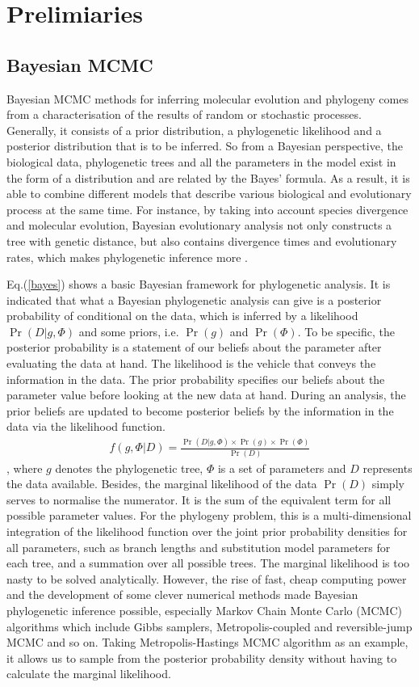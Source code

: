 \documentclass{bmcart}
\begin{document}
\section*{Prelimiaries}
\subsection*{Bayesian MCMC}
Bayesian MCMC methods for inferring molecular evolution and phylogeny comes from a characterisation of the results of random or stochastic processes. Generally, it consists of a prior distribution, a phylogenetic likelihood and a posterior distribution that is to be inferred. So from a Bayesian perspective, the biological data, phylogenetic trees and all the parameters in the model exist in the form of a distribution and are related by the Bayes' formula. As a result, it is able to combine different models that describe various biological and evolutionary process at the same time. For instance, by taking into account species divergence and molecular evolution, Bayesian evolutionary analysis not only constructs a tree with genetic distance, but also contains divergence times and evolutionary rates, which makes phylogenetic inference more .

Eq.(\ref{bayes}) shows a basic Bayesian framework for phylogenetic analysis. It is indicated that what a Bayesian phylogenetic analysis can give is a posterior probability of conditional on the data, which is inferred by a likelihood $\Pr (D|g,\Phi )$ and some priors, i.e. $\Pr (g) $ and $\Pr (\Phi )$. To be specific, the posterior probability is a statement of our beliefs about the parameter after evaluating the data at hand. The likelihood is the vehicle that conveys the information in the data. The prior probability specifies our beliefs about the parameter value before looking at the new data at hand. During an analysis, the prior beliefs are updated to become posterior beliefs by the information in the data via the likelihood function. 
\begin{eqnarray}\label{bayes}
f(g,\Phi |D) = \frac{{\Pr (D|g,\Phi ) \times \Pr (g) \times \Pr (\Phi )}}{{\Pr (D)}}
\end{eqnarray}
, where $g$ denotes the phylogenetic tree, $\Phi$ is a set of parameters and $D$ represents the data available. Besides, the marginal likelihood of the data ${\Pr (D)}$ simply serves to normalise the numerator. It is the sum of the equivalent term for all possible parameter values. For the phylogeny problem, this is a multi-dimensional integration of the likelihood function over the joint prior probability densities for all parameters, such as branch lengths and substitution model parameters for each tree, and a summation over all possible trees. The marginal likelihood is too nasty to be solved analytically. However, the rise of fast, cheap computing power and the development of some clever numerical methods made Bayesian phylogenetic inference possible, especially Markov Chain Monte Carlo (MCMC) algorithms which include Gibbs samplers, Metropolis-coupled and reversible-jump MCMC and so on. Taking Metropolis-Hastings MCMC algorithm as an example, it allows us to sample from the posterior probability density without having to calculate the marginal likelihood.
\end{document}
